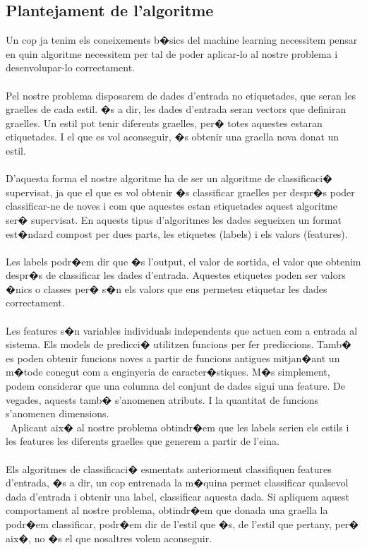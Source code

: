 \documentclass[12pt,a4paper,openright,oneside]{article}
\numberwithin{equation}{section}
\theoremstyle{definition}
\begin{document}
\newpage
\subsection{Plantejament de l'algoritme}
Un cop ja tenim els coneixements b�sics del machine learning necessitem pensar en quin algoritme necessitem per tal de poder aplicar-lo al nostre problema i desenvolupar-lo correctament. \\\\
Pel nostre problema disposarem de dades d'entrada no etiquetades, que seran les graelles de cada estil.  �s a dir, les dades d'entrada seran vectors que definiran graelles. Un estil pot tenir diferents graelles, per� totes aquestes estaran etiquetades. I el que es vol aconseguir, �s obtenir una graella nova donat un estil. \\\\
D'aquesta forma el nostre algoritme ha de ser un algoritme de classificaci� supervisat, ja que el que es vol obtenir �s classificar graelles per despr�s poder classificar-ne de noves i com que aquestes estan etiquetades aquest algoritme ser� supervisat. En aquests tipus d'algoritmes les dades segueixen un format est�ndard compost per dues parts, les etiquetes (labels) i els valors (features).\\\\
Les labels podr�em dir que �s l'output, el valor de sortida, el valor que obtenim despr�s de classificar les dades d'entrada. Aquestes etiquetes poden ser valors �nics o classes per� s�n els valors que ens permeten etiquetar les dades correctament. \\\\
Les features s�n variables individuals independents que actuen com a entrada al sistema. Els models de predicci� utilitzen funcions per fer prediccions. Tamb� es poden obtenir funcions noves a partir de funcions antigues mitjan�ant un m�tode conegut com a enginyeria de caracter�stiques. M�s simplement, podem considerar que una columna del conjunt de dades sigui una feature. De vegades, aquests tamb� s'anomenen atributs. I la quantitat de funcions s'anomenen dimensions. \\\
Aplicant aix� al nostre problema obtindr�em que les labels serien els estils i les features les diferents graelles que generem a partir de l'eina. \\\\
Els algoritmes de classificaci� esmentats anteriorment classifiquen features d'entrada, �s a dir, un cop entrenada la m�quina permet classificar qualsevol dada d'entrada i obtenir una label, classificar aquesta dada. Si apliquem aquest comportament al nostre problema, obtindr�em que donada una graella la podr�em classificar, podr�em dir de l'estil que �s, de l'estil que pertany, per� aix�, no �s el que nosaltres volem aconseguir.\\\\
\end{document}
